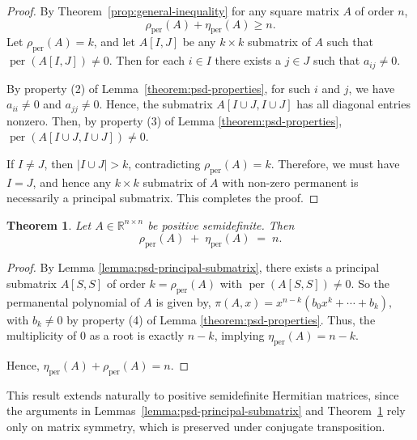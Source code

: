 \documentclass[11pt]{article}
\DeclareMathOperator{\per}{per}
\theoremstyle{plain}
\newtheorem{theorem}{Theorem}[section]   %
\theoremstyle{definition}
\theoremstyle{remark}
\begin{document}
\begin{proof}
By Theorem~\ref{prop:general-inequality} for any square matrix \( A \) of order $n$,
\[
\rho_{\operatorname{per}}(A) + \eta_{\operatorname{per}}(A) \ge n.
\]
Let \( \rho_{\operatorname{per}}(A) = k \), and let \( A[I, J] \) be any
$k\times k$ submatrix of \( A \) such that
\(
\operatorname{per}(A[I, J]) \neq 0.
\) Then for each  \(i \in I\) there exists a  \(j \in J \)  such that  \(a_{ij} \neq 0\).

By property (2) of Lemma~\ref{theorem:psd-properties}, for such \( i \) and \( j \), we have \( a_{ii} \neq 0 \) and \( a_{jj} \neq 0 \). Hence, the submatrix \( A[I \cup J, I \cup J] \) has all diagonal entries nonzero. Then, by property (3) of Lemma \ref{theorem:psd-properties},
\(
\operatorname{per}(A[I \cup J, I \cup J]) \neq 0.
\)

If \( I \neq J \), then \( |I \cup J| > k \), contradicting  \( \rho_{\operatorname{per}}(A) = k \). Therefore, we must have \( I = J \), and hence any $k\times k$ submatrix of \(A\)
with non-zero permanent is necessarily a principal submatrix.
This completes the proof.
\end{proof}



\begin{theorem}\label{thm:psd-prn}
Let \( A \in \mathbb{R}^{n \times n} \) be positive semidefinite.  Then
\[
\rho_{\operatorname{per}}(A) \;+\; \eta_{\operatorname{per}}(A) \;=\; n.
\]
\end{theorem}


\begin{proof}
By Lemma \ref{lemma:psd-principal-submatrix}, there exists a principal submatrix $A[S,S]$ of order $k = \rho_{\operatorname{per}}(A)$ with $\operatorname{per}(A[S,S]) \neq 0$. So the permanental polynomial of $A$ is given by, 
\(\pi(A,x) = x^{n-k} \left( b_0 x^k + \cdots + b_{k} \right), \) with \( b_{k} \neq 0\) by property (4) of Lemma \ref{theorem:psd-properties}. Thus, the multiplicity of $0$ as a root is exactly $n - k$, implying  $\eta_{\operatorname{per}}(A) = n - k$.

Hence, $
\eta_{\per}(A)+\rho_{\per}(A)=n.
$ \end{proof}

This result extends naturally to positive semidefinite Hermitian matrices,
since the arguments in Lemmas~\ref{lemma:psd-principal-submatrix}
and Theorem~\ref{thm:psd-prn} rely only on matrix symmetry, which is preserved under
conjugate transposition.
\end{document}
